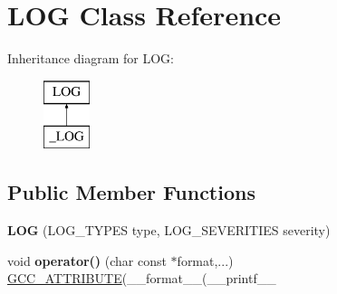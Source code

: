 \hypertarget{classLOG}{\section{L\-O\-G Class Reference}
\label{classLOG}
}
Inheritance diagram for L\-O\-G\-:\begin{figure}[H]
\begin{center}
\leavevmode
\includegraphics[height=2.000000cm]{classLOG}
\end{center}
\end{figure}
\subsection*{Public Member Functions}
\begin{DoxyCompactItemize}
\item 
\hypertarget{classLOG_a9e4ca0c6852f35edaa02ea890affc566}{{\bfseries L\-O\-G} (L\-O\-G\-\_\-\-T\-Y\-P\-E\-S type, L\-O\-G\-\_\-\-S\-E\-V\-E\-R\-I\-T\-I\-E\-S severity)}\label{classLOG_a9e4ca0c6852f35edaa02ea890affc566}

\item 
\hypertarget{classLOG_a170c2295486fb35227d7bec55e825b96}{void {\bfseries operator()} (char const $\ast$format,...) \hyperlink{structGCC__ATTRIBUTE}{G\-C\-C\-\_\-\-A\-T\-T\-R\-I\-B\-U\-T\-E}(\-\_\-\-\_\-format\-\_\-\-\_\-(\-\_\-\-\_\-printf\-\_\-\-\_\-}\label{classLOG_a170c2295486fb35227d7bec55e825b96}

\end{DoxyCompactItemize}
